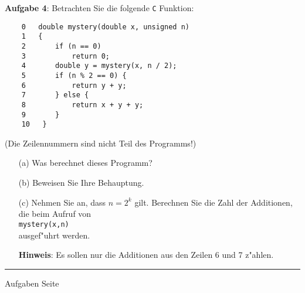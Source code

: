 
\begin{slide}{}
\normalsize


\footnotesize
\textbf{Aufgabe 4}: Betrachten Sie die folgende \texttt{C} Funktion:
\begin{verbatim}
    0   double mystery(double x, unsigned n)
    1   {
    2       if (n == 0)
    3           return 0;
    4       double y = mystery(x, n / 2);
    5       if (n % 2 == 0) {
    6           return y + y;
    7       } else {
    8           return x + y + y;
    9       }
    10   }
\end{verbatim}
(Die Zeilennummern sind nicht Teil des Programms!)
\begin{enumerate}
\item[(a)] Was berechnet dieses Programm?
\item[(b)] Beweisen Sie Ihre Behauptung.
\item[(c)] Nehmen Sie an, dass $n = 2^k$ gilt.  Berechnen Sie die Zahl
           der Additionen, die beim Aufruf von \\[0.3cm]
           \hspace*{1.3cm} \texttt{mystery(x,n)} \\[0.3cm]
           ausgef"uhrt werden.

           \textbf{Hinweis}: Es sollen nur die Additionen aus den Zeilen 6 und 7 z"ahlen.
\end{enumerate}

\vspace*{\fill}
\tiny \addtocounter{mypage}{1}
\rule{17cm}{1mm}
Aufgaben  \hspace*{\fill} Seite 
\end{slide}


